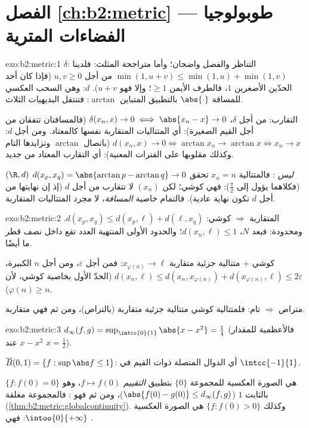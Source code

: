 \section*{الفصل \ref{ch:b2:metric} --- طوبولوجيا الفضاءات المترية}

\begin{solution}{exo:b2:metric:1}
$\delta$: التناظر والفصل واضحان؛ وأما متراجحة المثلث:
فلدينا $\min(1, u + v) \leq \min(1,u) + \min(1,v)$ من أجل $u, v \geq 0$ (فإذا كان أحد الحدّين الأصغرين
$1$، فالطرف الأيمن $\geq 1$؛ وإلا فهو $u + v$).
$d$: وهي السحب العكسي للمسافة $\abs{\cdot}$ بالتطبيق المتباين $\arctan$:
فتنتقل البديهيات الثلاث.

التقارب: من أجل $\delta$، $\delta(x_n, x) \to 0 \iff \abs{x_n - x}
\to 0$ (فالمسافتان تتفقان من أجل القيم الصغيرة): أي المتتاليات المتقاربة
نفسها كالمعتاد. ومن أجل $d$: $d(x_n, x) \to 0 \iff \arctan x_n \to
\arctan x \iff x_n \to x$ (باتصال $\arctan$ وتزايدها التام
وكذلك مقلوبها على الفترات المعنية): أي التقارب
المعتاد من جديد.

$(\R, d)$ \emph{ليس} : فالمتتالية $x_n = n$ تحقق $d(x_p, x_q)
= \abs{\arctan p - \arctan q} \to 0$ (فكلاهما يؤول إلى $\frac\pi2$):
فهي كوشي؛ لكن $(x_n)$ لا تتقارب من أجل $d$ (إذ إن نهايتها من أجل $d$
تكون نهاية عادية). فالتمام خاصية
\emph{المسافة}، لا مجرد المتتاليات المتقاربة.
\end{solution}

\begin{solution}{exo:b2:metric:2}
المتقاربة $\Rightarrow$ كوشي: $d(x_p, x_q) \leq d(x_p, \ell) +
d(\ell, x_q)$. ومحدودة: فبعد $N$، $d(x_n, \ell) \leq 1$؛
والحدود الأولى المنتهية العدد تقع داخل نصف قطر ما أيضًا.

كوشي $+$ متتالية جزئية متقاربة $x_{\varphi(n)} \to \ell$: فمن أجل
$\varepsilon$، ومن أجل $n$ الكبيرة، $d(x_n, \ell) \leq d(x_n,
x_{\varphi(n)}) + d(x_{\varphi(n)}, \ell) \leq 2\varepsilon$ (الحدّ
الأول بخاصية كوشي، لأن $\varphi(n) \geq n$).

متراص $\Rightarrow$ تام: فلمتتالية كوشي متتالية جزئية
متقاربة (بالتراص)، ومن ثم فهي متقاربة.
\end{solution}

\begin{solution}{exo:b2:metric:3}
$d_\infty(f, g) = \sup_{\intcc{0}{1}} \abs{x - x^2} = \frac14$
(فالأعظمية للمقدار $x - x^2$ عند $x = \frac12$).

$\overline B(0, 1) = \{f : \sup\abs f \leq 1\}$: أي الدوال
المتصلة ذوات القيم في $\intcc{-1}{1}$.

$\{f : f(0) = 0\}$ هي الصورة العكسية للمجموعة $\{0\}$ بتطبيق
\emph{التقييم} $f \mapsto f(0)$، وهو  بالثابت $1$
($\abs{f(0) - g(0)} \leq d_\infty(f,g)$)، ومن ثم فهو : فالمجموعة
مغلقة (\cref{thm:b2:metric:globalcontinuity}). وكذلك $\{f :
f(0) > 0\}$ هي الصورة العكسية  $\intoo{0}{+\infty}$: فهي .
\end{solution}

